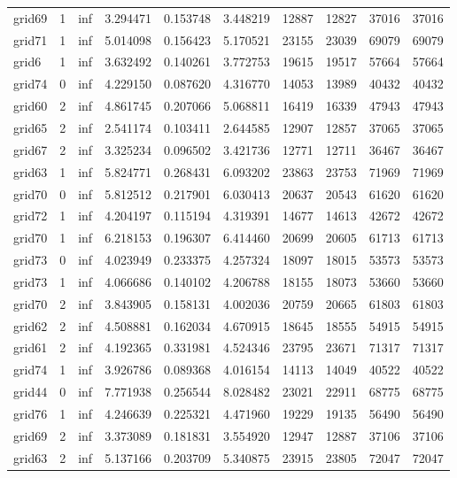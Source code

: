 \begin{longtable}{|l|r|r|r|r|r|r|r|r|r|}
grid69 & 1 & inf & 3.294471 & 0.153748 & 3.448219 & 12887 & 12827 & 37016 & 37016 \\
grid71 & 1 & inf & 5.014098 & 0.156423 & 5.170521 & 23155 & 23039 & 69079 & 69079 \\
grid6 & 1 & inf & 3.632492 & 0.140261 & 3.772753 & 19615 & 19517 & 57664 & 57664 \\
grid74 & 0 & inf & 4.229150 & 0.087620 & 4.316770 & 14053 & 13989 & 40432 & 40432 \\
grid60 & 2 & inf & 4.861745 & 0.207066 & 5.068811 & 16419 & 16339 & 47943 & 47943 \\
grid65 & 2 & inf & 2.541174 & 0.103411 & 2.644585 & 12907 & 12857 & 37065 & 37065 \\
grid67 & 2 & inf & 3.325234 & 0.096502 & 3.421736 & 12771 & 12711 & 36467 & 36467 \\
grid63 & 1 & inf & 5.824771 & 0.268431 & 6.093202 & 23863 & 23753 & 71969 & 71969 \\
grid70 & 0 & inf & 5.812512 & 0.217901 & 6.030413 & 20637 & 20543 & 61620 & 61620 \\
grid72 & 1 & inf & 4.204197 & 0.115194 & 4.319391 & 14677 & 14613 & 42672 & 42672 \\
grid70 & 1 & inf & 6.218153 & 0.196307 & 6.414460 & 20699 & 20605 & 61713 & 61713 \\
grid73 & 0 & inf & 4.023949 & 0.233375 & 4.257324 & 18097 & 18015 & 53573 & 53573 \\
grid73 & 1 & inf & 4.066686 & 0.140102 & 4.206788 & 18155 & 18073 & 53660 & 53660 \\
grid70 & 2 & inf & 3.843905 & 0.158131 & 4.002036 & 20759 & 20665 & 61803 & 61803 \\
grid62 & 2 & inf & 4.508881 & 0.162034 & 4.670915 & 18645 & 18555 & 54915 & 54915 \\
grid61 & 2 & inf & 4.192365 & 0.331981 & 4.524346 & 23795 & 23671 & 71317 & 71317 \\
grid74 & 1 & inf & 3.926786 & 0.089368 & 4.016154 & 14113 & 14049 & 40522 & 40522 \\
grid44 & 0 & inf & 7.771938 & 0.256544 & 8.028482 & 23021 & 22911 & 68775 & 68775 \\
grid76 & 1 & inf & 4.246639 & 0.225321 & 4.471960 & 19229 & 19135 & 56490 & 56490 \\
grid69 & 2 & inf & 3.373089 & 0.181831 & 3.554920 & 12947 & 12887 & 37106 & 37106 \\
grid63 & 2 & inf & 5.137166 & 0.203709 & 5.340875 & 23915 & 23805 & 72047 & 72047 \\

\end{longtable}
